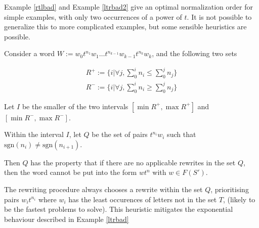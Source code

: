 \documentclass[11pt]{article} %
\theoremstyle{definition}
\theoremstyle{definition}
\theoremstyle{definition}
\newtheorem{lemma}{Lemma}[theorem]
\theoremstyle{definition}
\theoremstyle{definition}
\theoremstyle{definition}
\begin{document}
Example \ref{rtlbad} and Example \ref{ltrbad2} give an optimal normalization order
for simple examples, with only two occurrences of a power of $t$.
It is not possible to generalize this to more complicated examples,
but some sensible heuristics are possible.

Consider a word $W := w_0t^{n_1}w_1 \dots t^{n_{k-1}}w_{k-1}t^{n_k}w_k$, and the
following two sets

\begin{equation*}
  \begin{aligned}
    R^{+} := \{ i | \forall j, \sum_0^i n_i \le \sum_0^j n_j\} \\
    R^{-} := \{ i | \forall j, \sum_0^i n_i \ge \sum_0^j n_j\}
  \end{aligned}
\end{equation*}

Let $I$ be the smaller of the two intervals $[\min R^+, \max R^+]$ and
$[\min R^{-}, \max R^-]$.

Within the interval $I$, let $Q$ be the set of pairs $t^{n_i}w_i$ such that
$\text{sgn}(n_i) \ne \text{sgn}(n_{i+1})$.

Then $Q$ has the property that if there are no applicable rewrites
in the set $Q$, then the word cannot be put into the form $wt^n$ with $w \in F(S')$.

The rewriting procedure always chooses a rewrite within the set $Q$, prioritising
pairs $w_it^{n_i}$ where $w_i$ has the least occurences of letters not in
the set $T$, (likely to be the fastest problems to solve).
This heuristic mitigates the exponential behaviour described in Example \ref{ltrbad}







\end{document}
